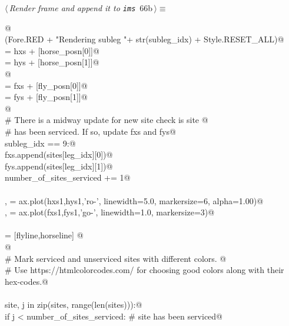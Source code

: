\documentclass[11.5pt]{report}
\begin{document}
\begin{flushleft} \small\label{scrap96}\raggedright\small
{} $\langle\,${\itshape Render frame and append it to \verb|ims|}\nobreak\ {\footnotesize {66b}}$\,\rangle\equiv$
\vspace{-1ex}
\begin{list}{}{} \item
\mbox{}\verb@   @\\
\mbox{}\verb@debug(Fore.RED + "Rendering subleg "+ str(subleg_idx) + Style.RESET_ALL)@\\
\mbox{} = hxs + [horse_posn[0]]@\\
\mbox{} = hys + [horse_posn[1]]@\\
\mbox{}\verb@               @\\
\mbox{} = fxs + [fly_posn[0]]@\\
\mbox{} = fys + [fly_posn[1]]@\\
\mbox{}\verb@                 @\\
\mbox{}\verb@# There is a midway update for new site check is site @\\
\mbox{}\verb@# has been serviced. If so, update fxs and fys@\\
\mbox{}\verb@if subleg_idx == 9:@\\
\mbox{}\verb@    fxs.append(sites[leg_idx][0])@\\
\mbox{}\verb@    fys.append(sites[leg_idx][1])@\\
\mbox{}\verb@    number_of_sites_serviced += 1@\\
\mbox{}\verb@@\\
\mbox{}\verb@horseline, = ax.plot(hxs1,hys1,'ro-', linewidth=5.0, markersize=6, alpha=1.00)@\\
\mbox{}\verb@flyline,   = ax.plot(fxs1,fys1,'go-', linewidth=1.0, markersize=3)@\\
\mbox{}\verb@@\\
\mbox{}\verb@objs = [flyline,horseline] @\\
\mbox{}\verb@ @\\
\mbox{}\verb@# Mark serviced and unserviced sites with different colors. @\\
\mbox{}\verb@# Use https://htmlcolorcodes.com/ for choosing good colors along with their hex-codes.@\\
\mbox{}\verb@@\\
\mbox{}\verb@for site, j in zip(sites, range(len(sites))):@\\
\mbox{}\verb@    if j < number_of_sites_serviced:       # site has been serviced@\\

\end{list}
\end{flushleft}
\end{document}
